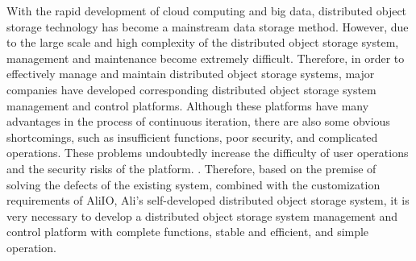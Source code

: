 \begin{abstract*}


  With the rapid development of cloud computing and big data, distributed object storage technology has become a mainstream data storage method. 
  However, due to the large scale and high complexity of the distributed object storage system, management and maintenance become extremely 
  difficult. Therefore, in order to effectively manage and maintain distributed object storage systems, major companies have developed 
  corresponding distributed object storage system management and control platforms. Although these platforms have many advantages in the 
  process of continuous iteration, there are also some obvious shortcomings, such as insufficient functions, poor security, and complicated 
  operations. These problems undoubtedly increase the difficulty of user operations and the security risks of the platform. . Therefore, based on 
  the premise of solving the defects of the existing system, combined with the customization requirements of AliIO, Ali's self-developed distributed
  object storage system, it is very necessary to develop a distributed object storage system management and control platform with complete 
  functions, stable and efficient, and simple operation.


\end{abstract*}
